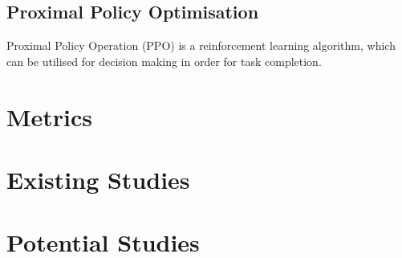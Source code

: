 \documentclass{article}
\begin{document}
\subsection{Proximal Policy Optimisation}

Proximal Policy Operation (PPO) is a reinforcement learning algorithm, which can be utilised for decision making in order for task completion. \cite{schulman2017proximal}

\section{Metrics}



\section{Existing Studies}

\section{Potential Studies}



{}

\end{document}
